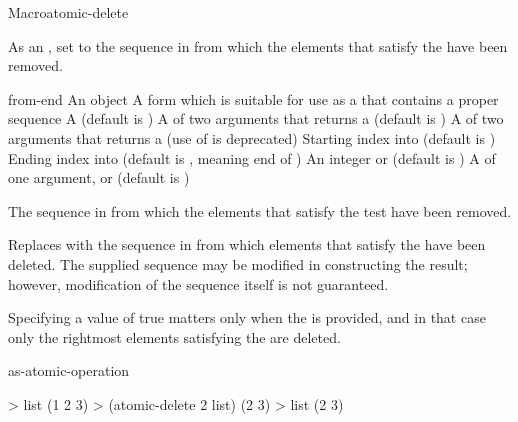 \documentclass[10pt,twoside,english,pdftex]{article}
\begin{document}
\begin{functiondoc}{Macro}{atomic-delete}{
     
    \returns{} }
%

\fnsyntax

\fnpurpose As an , set  to the
sequence in  from which the elements that satisfy the
 have been removed.

\fnpackage {}

\fnmodule {}

\fnargs
\begin{args}{from-end}
\arg[item] An object
\arg[place] A form which is suitable for use as a
 that contains a proper sequence
 A  (default is \nil)
\arg[test] A  of two arguments that returns a
 (default is ) 
 A  of two arguments that returns a
 (use of  is deprecated)
\arg[start] Starting index into  (default is )
\arg[end] Ending index into  (default is \nil, meaning
end of )
\arg[count] An integer or \nil{} (default is \nil)
\arg[key] A  of one argument, or \nil{} (default is \nil)
\end{args}

\fnreturns The sequence in  from which the elements that
satisfy the test have been removed.

\fndescription Replaces  with the sequence in
 from which elements that satisfy the  have
been deleted.  The supplied  sequence may be modified in
constructing the result; however, modification of the sequence itself
is not guaranteed.

Specifying a  value of true matters only when
the  is provided, and in that case only the rightmost
 elements satisfying the  are deleted.

\begin{alsos}{as-atomic-operation}
\end{alsos}

\fnexample
\begin{example}
> list
(1 2 3)
> (atomic-delete 2 list)
(2 3)
> list
(2 3)
\end{example}

\end{functiondoc}
\end{document}
